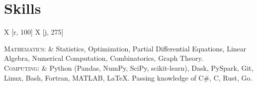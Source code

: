 \documentclass[letterpaper,11pt]{article} %
\newcommand\tabuwidth{\textwidth}  %
\newcommand\rcol{275}  %
\begin{document}
\section{Skills}

\begin{center}
\begin{tabu} to \tabuwidth {X [r, 100] X [j, \rcol]}

\textsc{Mathematics:} &
    Statistics,
    Optimization,
    Partial Differential Equations,
    Linear Algebra,
    Numerical Computation,
    Combinatorics,
    Graph Theory. \\
\textsc{Computing:} &
    Python (Pandas, NumPy, SciPy, scikit-learn),
    Dask,
    PySpark,
    Git,
    Linux,
    Bash,
    Fortran,
    MATLAB,
    \LaTeX.
    Passing knowledge of C\#, C, Rust, Go. \\

\end{tabu}
\end{center}
\end{document}
